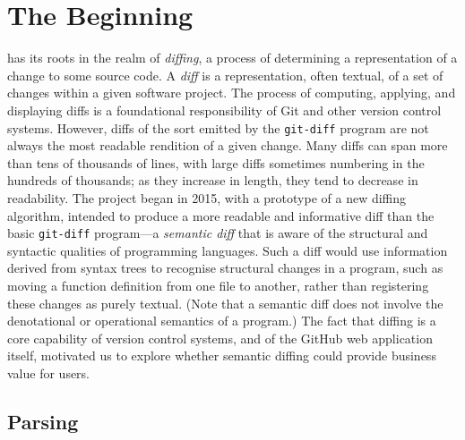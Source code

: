 \documentclass[acmsmall,fleqn,12pt]{acmart}
\begin{document}


\section{The Beginning} \label{sec:beginning}

\semantic{} has its roots in the realm of \emph{diffing}, a process of
determining a representation of a change to some source code. A \emph{diff} is a
representation, often textual, of a set of changes within a given software
project. The process of computing, applying, and displaying diffs is a
foundational responsibility of Git and other version control systems. However,
diffs of the sort emitted by the \texttt{git-diff} program are not always the
most readable rendition of a given change. Many diffs can span more than tens of
thousands of lines, with large diffs sometimes numbering in the hundreds of
thousands; as they increase in length, they tend to decrease in readability. The
\semantic{} project began in 2015, with a prototype of a new diffing algorithm,
intended to produce a more readable and informative diff than the basic
\texttt{git-diff} program---a \emph{semantic diff} that is aware of the
structural and syntactic qualities of programming languages. Such a diff would
use information derived from syntax trees to recognise structural changes in a
program, such as moving a function definition from one file to another, rather
than registering these changes as purely textual. (Note that a semantic diff
does not involve the denotational or operational semantics of a program.) The
fact that diffing is a core capability of version control systems, and of the
GitHub web application itself, motivated us to explore whether semantic diffing
could provide business value for users.

\subsection{Parsing}
\end{document}
